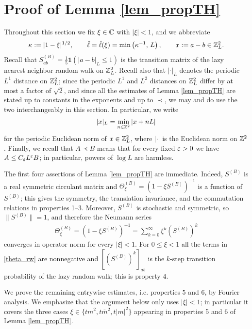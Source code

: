 \section{Proof of Lemma \ref{lem_propTH}}\label{sec_TH}
Throughout this section we fix $\xi\in\mathbb C$ with $|\xi|<1$, and we abbreviate
%
\begin{equation}\label{eq_kappa_def}
\kappa:=|1-\xi|^{1/2},\qquad \hat\ell=\hat{\ell}(\xi)=\min\left(\kappa^{-1},\,L\right),\qquad x:=a-b\in\mathbb{Z}_{L}^{2}.
\end{equation}
%
Recall that $S^{(B)}_{ab}=\frac{1}{5}\mathbf{1}(|a-b|_{L}\leq1)$ is the transition matrix of the lazy nearest-neighbor random walk on $\mathbb{Z}_{L}^{2}$. Recall also that $|\cdot|_{L}$ denotes the periodic $L^{1}$ distance on $\mathbb{Z}_{L}^{2}$; since the periodic $L^{1}$ and $L^{2}$ distances on $\mathbb{Z}_{L}^{2}$ differ by at most a factor of $\sqrt{2}$, and since all the estimates of Lemma \ref{lem_propTH} are stated up to constants in the exponents and up to $\prec$, we may and do use the two interchangeably in this section. In particular, we write
%
\begin{align*}
|x|_{L}=\min_{n\in\mathbb{Z}^{2}}|x+nL|
\end{align*}
%
for the periodic Euclidean norm of $x\in\mathbb{Z}_{L}^{2}$, where $|\cdot|$ is the Euclidean norm on $\mathbb{Z}^{2}$. Finally, we recall that $A\prec B$ means that for every fixed ${\varepsilon}>0$ we have $A\leq C_{{\varepsilon}}L^{{\varepsilon}}B$; in particular, powers of $\log L$ are harmless.

The first four assertions of Lemma \ref{lem_propTH} are immediate. Indeed, $S^{(B)}$ is a real symmetric circulant matrix and $\Theta^{(B)}_{\xi}=(1-\xi S^{(B)})^{-1}$ is a function of $S^{(B)}$; this gives the symmetry, the translation invariance, and the commutation relations in properties 1--3. Moreover, $S^{(B)}$ is stochastic and symmetric, so $\|S^{(B)}\|=1$, and therefore the Neumann series
%
\begin{align}
\Theta^{(B)}_{\xi}=(1-\xi S^{(B)})^{-1}=\sum_{k=0}^{\infty}\xi^{k}(S^{(B)})^{k}\label{theta_rw}
\end{align}
%
converges in operator norm for every $|\xi|<1$. For $0\leq\xi<1$ all the terms in \eqref{theta_rw} are nonnegative and $[(S^{(B)})^{k}]_{ab}$ is the $k$-step transition probability of the lazy random walk; this is property 4.

We prove the remaining entrywise estimates, i.e. properties 5 and 6, by Fourier analysis. We emphasize that the argument below only uses $|\xi|<1$; in particular it covers the three cases $\xi\in\{tm^{2},t\bar m^{2},t|m|^{2}\}$ appearing in properties 5 and 6 of Lemma \ref{lem_propTH}.

